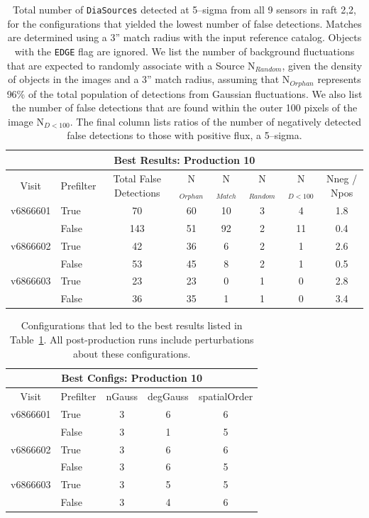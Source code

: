 \documentclass[prd, nofootinbib, floatfix, 11pt,tightenlines,times]{article}
\begin{document}
\begin{table}
\centering
\begin{tabular}{clcccccc}
\hline
\multicolumn{8}{|c|}{Best Results: Production 10} \\
\hline
Visit    & Prefilter & Total False Detections &  N$_{Orphan}$ & N$_{Match}$ & N$_{Random}$ & N$_{D<100}$ & Nneg / Npos \\
\hline
v6866601 & True      & 70      &60         & 10 & 3     & 4   & 1.8 \\ 
         & False     & 143     &51         & 92 & 2     & 11  & 0.4 \\
v6866602 & True      & 42      &36         & 6  & 2     & 1   & 2.6 \\
         & False     & 53      &45         & 8  & 2     & 1   & 0.5 \\
v6866603 & True      & 23      &23         & 0  & 1     & 0   & 2.8 \\
         & False     & 36      &35         & 1  & 1     & 0   & 3.4 \\
\end{tabular}
\caption{Total number of {\tt DiaSources} detected at 5--sigma from
  all 9 sensors in raft 2,2, for the configurations that yielded the
  lowest number of false detections.  Matches are determined using a
  3'' match radius with the input reference catalog.  Objects with the
  {\tt EDGE} flag are ignored.  We list the number of background
  fluctuations that are expected to randomly associate with a Source
  N$_{Random}$, given the density of objects in the images and a 3''
  match radius, assuming that N$_{Orphan}$ represents 96\% of the
  total population of detections from Gaussian fluctuations.
  We also list the number of false detections that are found within
  the outer 100 pixels of the image N$_{D<100}$.  The final column
  lists ratios of the number of negatively detected false detections
  to those with positive flux, a 5--sigma. \label{tab-bestfp10}}
\end{table}


\begin{table}
\centering
\begin{tabular}{clccc}
\hline
\multicolumn{5}{|c|}{Best Configs: Production 10} \\
\hline
Visit    & Prefilter & nGauss & degGauss & spatialOrder \\
\hline
v6866601 & True      & 3      & 6        & 6 \\
         & False     & 3      & 1        & 5 \\
v6866602 & True      & 3      & 6        & 6 \\
         & False     & 3      & 6        & 5 \\
v6866603 & True      & 3      & 5        & 5 \\
         & False     & 3      & 4        & 6 \\
\end{tabular}
\caption{Configurations that led to the best results listed in
  Table~\ref{tab-bestfp10}.  All post-production runs include
  perturbations about these configurations. \label{tab-bestconfig10}}
\end{table}
\end{document}
